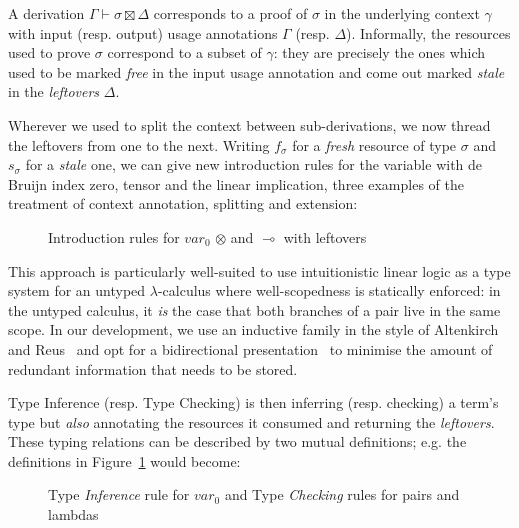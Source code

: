 \documentclass[a4paper]{easychair}
\begin{document}
A derivation $Γ ⊢ σ ⊠ Δ$ corresponds to a proof of $σ$ in the underlying
context $γ$ with input (resp. output) usage annotations $Γ$ (resp. $Δ$).
Informally, the resources used to prove $σ$ correspond to a subset of
$γ$: they are precisely the ones which used to be marked \emph{free}
in the input usage annotation and come out marked \emph{stale} in the
\emph{leftovers} $Δ$.

Wherever we used to split the context between sub-derivations, we now
thread the leftovers from one to the next. Writing $f_{σ}$ for a
\emph{fresh} resource of type $σ$ and $s_{σ}$ for a \emph{stale} one,
we can give new introduction rules for the variable with de Bruijn
index zero, tensor and the linear implication, three examples of the
treatment of context annotation, splitting and extension:

\begin{figure}[ht]
\caption{Introduction rules for $var_0$ $⊗$ and $⊸$ with leftovers\label{rules:leftovers}}
\end{figure}

This approach is particularly well-suited to use intuitionistic linear
logic as a type system for an untyped $λ$-calculus where well-scopedness
is statically enforced: in the untyped calculus, it \emph{is} the case
that both branches of a pair live in the same scope. In our development,
we use an inductive family in the style of Altenkirch and Reus~\cite{Altenkirch1999}
and opt for a bidirectional presentation~\cite{Pierce:2000:LTI:345099.345100}
to minimise the amount of redundant information that needs to be stored.

Type Inference (resp. Type Checking) is then inferring (resp. checking)
a term's type but \emph{also} annotating the resources it consumed and
returning the \emph{leftovers}. These typing relations can be described
by two mutual definitions; e.g. the definitions in Figure~\ref{rules:leftovers}
would become:

\begin{figure}[ht]
\caption{Type \emph{Inference} rule for $var_0$ and Type \emph{Checking} rules for pairs and lambdas\label{rules:checking}}
\end{figure}
\end{document}
